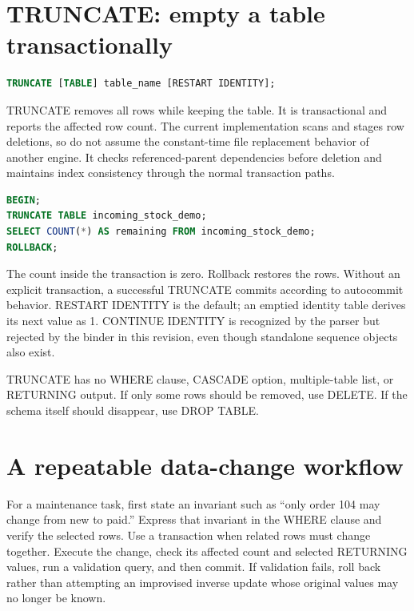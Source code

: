 \section{TRUNCATE: empty a table transactionally}

\begin{lstlisting}[language=SQL]
TRUNCATE [TABLE] table_name [RESTART IDENTITY];
\end{lstlisting}

TRUNCATE removes all rows while keeping the table. It is transactional and reports the affected row count. The current implementation scans and stages row deletions, so do not assume the constant-time file replacement behavior of another engine. It checks referenced-parent dependencies before deletion and maintains index consistency through the normal transaction paths.

\begin{lstlisting}[language=SQL]
BEGIN;
TRUNCATE TABLE incoming_stock_demo;
SELECT COUNT(*) AS remaining FROM incoming_stock_demo;
ROLLBACK;
\end{lstlisting}

The count inside the transaction is zero. Rollback restores the rows. Without an explicit transaction, a successful TRUNCATE commits according to autocommit behavior. RESTART IDENTITY is the default; an emptied identity table derives its next value as 1. CONTINUE IDENTITY is recognized by the parser but rejected by the binder in this revision, even though standalone sequence objects also exist.

TRUNCATE has no WHERE clause, CASCADE option, multiple-table list, or RETURNING output. If only some rows should be removed, use DELETE. If the schema itself should disappear, use DROP TABLE.


\section{A repeatable data-change workflow}

For a maintenance task, first state an invariant such as ``only order 104 may change from new to paid.'' Express that invariant in the WHERE clause and verify the selected rows. Use a transaction when related rows must change together. Execute the change, check its affected count and selected RETURNING values, run a validation query, and then commit. If validation fails, roll back rather than attempting an improvised inverse update whose original values may no longer be known.

